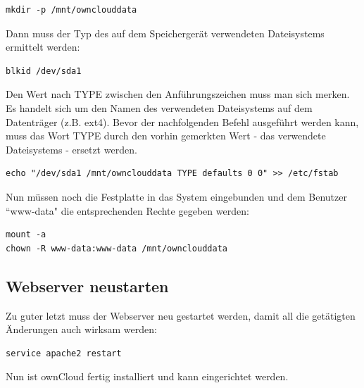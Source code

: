 \begin{lstlisting}
mkdir -p /mnt/ownclouddata
\end{lstlisting}

Dann muss der Typ des auf dem Speichergerät verwendeten Dateisystems ermittelt werden:

\begin{lstlisting}
blkid /dev/sda1
\end{lstlisting}

Den Wert nach TYPE zwischen den Anführungszeichen muss man sich merken. Es handelt sich um den Namen des verwendeten Dateisystems auf dem Datenträger (z.B. ext4).
Bevor der nachfolgenden Befehl ausgeführt werden kann, muss das Wort TYPE durch den vorhin gemerkten Wert - das verwendete Dateisystems - ersetzt werden.

\begin{lstlisting}
echo "/dev/sda1 /mnt/ownclouddata TYPE defaults 0 0" >> /etc/fstab
\end{lstlisting}

Nun müssen noch die Festplatte in das System eingebunden und dem Benutzer ``www-data" die entsprechenden Rechte gegeben werden:

\begin{lstlisting}
mount -a
chown -R www-data:www-data /mnt/ownclouddata
\end{lstlisting}

\subsection{Webserver neustarten}
Zu guter letzt muss der Webserver neu gestartet werden, damit all die getätigten Änderungen auch wirksam werden:

\begin{lstlisting}
service apache2 restart
\end{lstlisting}

Nun ist ownCloud fertig installiert und kann eingerichtet werden.
